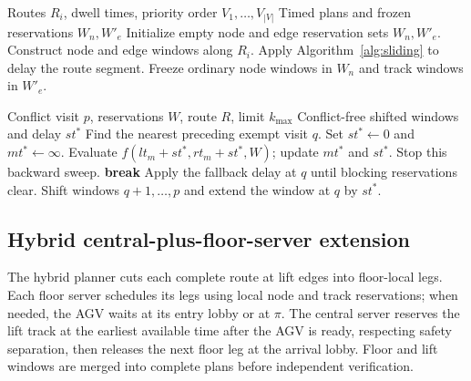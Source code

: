\begin{algorithm}[t]
\caption{Prioritized conflict-free routing (Algorithm 2)}
\label{alg:routing}
\small
\begin{algorithmic}[1]
\REQUIRE Routes $R_i$, dwell times, priority order $V_1,\ldots,V_{|V|}$
\ENSURE Timed plans and frozen reservations $W_n,W'_e$
\STATE Initialize empty node and edge reservation sets $W_n,W'_e$.
  \STATE Construct node and edge windows along $R_i$.
    \STATE Apply Algorithm~\ref{alg:sliding} to delay the route segment.
  \ENDFOR
  \STATE Freeze ordinary node windows in $W_n$ and track windows in $W'_e$.
\ENDFOR
\end{algorithmic}
\end{algorithm}

\begin{algorithm}[t]
\caption{Sliding-window conflict elimination (Algorithm 3)}
\label{alg:sliding}
\small
\begin{algorithmic}[1]
\REQUIRE Conflict visit $p$, reservations $W$, route $R$, limit $k_{\max}$
\ENSURE Conflict-free shifted windows and delay $st^*$
\STATE Find the nearest preceding exempt visit $q$.
  \STATE Set $st^*\gets0$ and $mt^*\gets\infty$.
    \STATE Evaluate $f(lt_m+st^*,rt_m+st^*,W)$; update $mt^*$ and $st^*$.
     \STATE Stop this backward sweep. \ENDIF
  \ENDFOR
   \STATE \textbf{break} \ENDIF
\ENDFOR
{}
  \STATE Apply the fallback delay at $q$ until blocking reservations clear.
\ENDIF
\STATE Shift windows $q+1,\ldots,p$ and extend the window at $q$ by $st^*$.
\end{algorithmic}
\end{algorithm}

\subsection{Hybrid central-plus-floor-server extension}
The hybrid planner cuts each complete route at lift edges into floor-local legs. Each floor server schedules its legs using local node and track reservations; when needed, the AGV waits at its entry lobby or at $\pi$. The central server reserves the lift track at the earliest available time after the AGV is ready, respecting safety separation, then releases the next floor leg at the arrival lobby. Floor and lift windows are merged into complete plans before independent verification.

